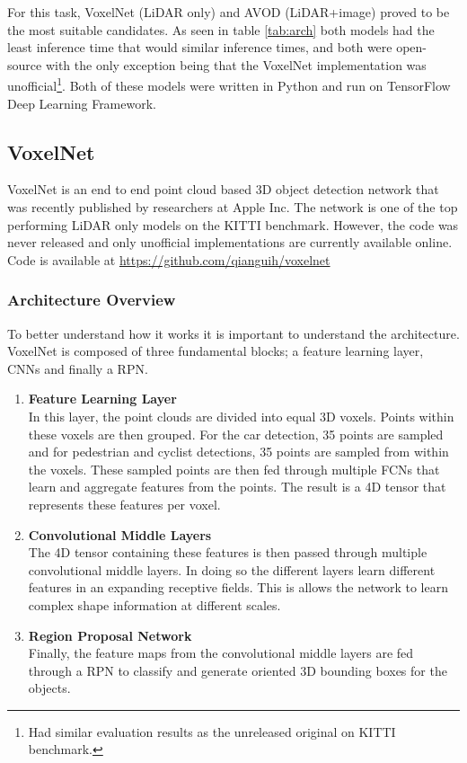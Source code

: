 For this task, VoxelNet (LiDAR only) and AVOD (LiDAR+image) proved to be the most suitable candidates. As seen in table \ref{tab:arch} both models had the least inference time that would similar inference times, and both were open-source with the only exception being that the VoxelNet implementation was unofficial\footnote{Had similar evaluation results as the unreleased original on KITTI benchmark.}. Both of these models were written in Python and run on TensorFlow Deep Learning Framework.


\subsection{VoxelNet}
VoxelNet is an end to end point cloud based 3D object detection network that was recently  published by researchers at Apple Inc. The network is one of the top performing LiDAR only models on the KITTI benchmark. However, the code was never released and only unofficial implementations are currently available online.
Code is available at \url{https://github.com/qianguih/voxelnet}
\subsubsection{Architecture Overview}
To better understand how it works it is important to understand the architecture. VoxelNet is composed of three fundamental blocks; a feature learning layer, CNNs and finally a RPN. 
\begin{enumerate}
	\item \textbf{Feature Learning Layer} \\ 
	In this layer, the point clouds are divided into equal 3D voxels. Points within these voxels are then grouped. For the car detection, 35 points are sampled and for pedestrian and cyclist detections, 35 points are sampled from within the voxels. These sampled points are then fed through multiple FCNs that learn and aggregate features from the points. The result is a 4D tensor that represents these features per voxel.
	
	\item \textbf{Convolutional Middle Layers} \\ 
	The 4D tensor containing these features is then passed through multiple convolutional middle layers. In doing so the different layers learn different features in an expanding receptive fields. This is allows the network to learn complex shape information at different scales. 
	\item \textbf{Region Proposal Network} \\ 
	Finally, the feature maps from the convolutional middle layers are fed through a RPN to classify and generate  oriented 3D bounding boxes for the objects. 
	
\end{enumerate}

